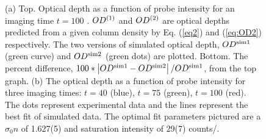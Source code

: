 \documentclass[12pt]{iopart}
\begin{document}
\begin{figure}
\caption{(a) Top. Optical depth as a function of probe intensity for an imaging time $t=100$ \us. $OD^{\rm{(1)}}$ and $OD^{\rm{(2)}}$ are optical depths predicted from a given column density by Eq. (\ref{eq2}) and (\ref{eq:OD2}) respectively.  The two versions of simulated optical depth, $OD^{\rm{sim1}}$ (green curve) and $OD^{\rm{sim2}}$ (green dots) are plotted. Bottom. The percent difference, $100*\left|OD^{\rm{sim1}}-OD^{\rm{sim2}}\right|/OD^{\rm{sim1}} $, from the top graph. (b) The optical depth as a function of probe intensity for three imaging times: $t=40$\us{} (blue),  $t=75$\us{} (green),  $t=100$\us{} (red). The dots represent experimental data and the lines represent the best fit of simulated data. The optimal fit parameters pictured are a $\sigma_0 n$ of 1.627(5) and saturation intensity of 29(7) counts/\us{}.  }
\label{fig:compareModelsAndIsat}
\end{figure}
\end{document}
